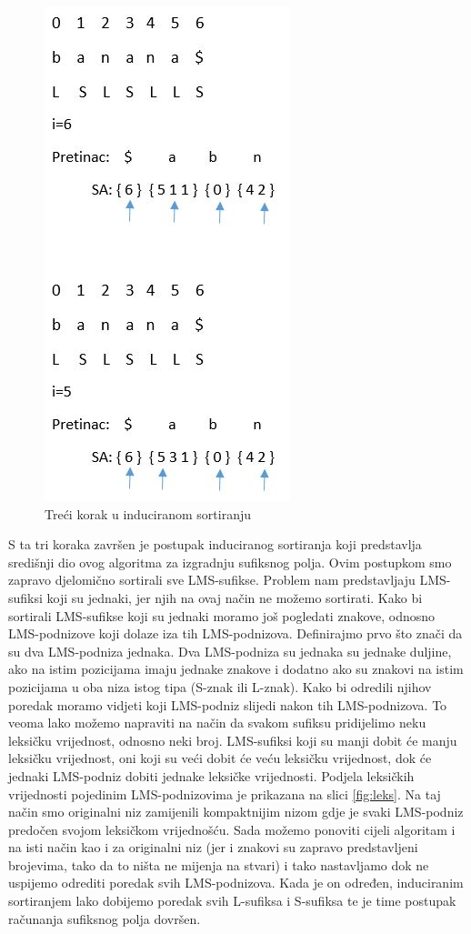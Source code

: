 \begin{figure}[H]
   \centering
       \includegraphics{./pictures/SAISstep3.jpg}
 \caption{Treći korak u induciranom sortiranju}
 \label{fig:sais3}
\end{figure}

S ta tri koraka završen je postupak induciranog sortiranja koji predstavlja središnji dio ovog algoritma za izgradnju sufiksnog polja. Ovim postupkom smo zapravo djelomično sortirali sve LMS-sufikse. Problem nam predstavljaju LMS-sufiksi koji su jednaki, jer njih na ovaj način ne možemo sortirati. Kako bi sortirali LMS-sufikse koji su jednaki moramo još pogledati znakove, odnosno LMS-podnizove koji dolaze iza tih LMS-podnizova. Definirajmo prvo što znači da su dva LMS-podniza jednaka. Dva LMS-podniza su jednaka su jednake duljine, ako na istim pozicijama imaju jednake znakove i dodatno ako su znakovi na istim pozicijama u oba niza istog tipa (S-znak ili L-znak). Kako bi odredili njihov poredak moramo vidjeti koji LMS-podniz slijedi nakon tih LMS-podnizova. To veoma lako možemo napraviti na način da svakom sufiksu pridijelimo neku leksičku vrijednost, odnosno neki broj. LMS-sufiksi koji su manji dobit će manju leksičku vrijednost, oni koji su veći dobit će veću leksičku vrijednost, dok će jednaki LMS-podniz dobiti jednake leksičke vrijednosti. Podjela leksičkih vrijednosti pojedinim LMS-podnizovima je prikazana na slici \ref{fig:leks}. Na taj način smo originalni niz zamijenili kompaktnijim nizom gdje je svaki LMS-podniz predočen svojom leksičkom vrijednošću. Sada možemo ponoviti cijeli algoritam i na isti način kao i za originalni niz (jer i znakovi su zapravo predstavljeni brojevima, tako da to ništa ne mijenja na stvari) i tako nastavljamo dok ne uspijemo odrediti poredak svih LMS-podnizova. Kada je on određen, induciranim sortiranjem lako dobijemo poredak svih L-sufiksa i S-sufiksa te je time postupak računanja sufiksnog polja dovršen.

